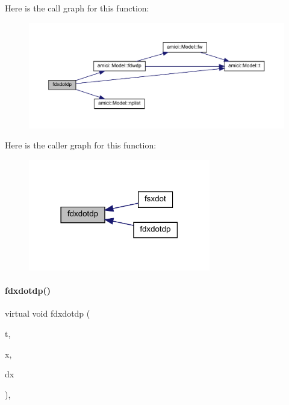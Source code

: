 Here is the call graph for this function\+:
\nopagebreak
\begin{figure}[H]
\begin{center}
\leavevmode
\includegraphics[width=350pt]{classamici_1_1_model___d_a_e_a551dfccd2fb1aa618c644a580639f5b8_cgraph}
\end{center}
\end{figure}
Here is the caller graph for this function\+:
\nopagebreak
\begin{figure}[H]
\begin{center}
\leavevmode
\includegraphics[width=225pt]{classamici_1_1_model___d_a_e_a551dfccd2fb1aa618c644a580639f5b8_icgraph}
\end{center}
\end{figure}
\mbox{\label{classamici_1_1_model___d_a_e_afd60580b84c72713288796453f6da33a}} 
\paragraph{\texorpdfstring{fdxdotdp()}{fdxdotdp()}\hspace{0.1cm}{\footnotesize\ttfamily [2/3]}}
{\footnotesize\ttfamily virtual void fdxdotdp (\begin{DoxyParamCaption}\item[{\mbox{\hyperlink{namespaceamici_a1bdce28051d6a53868f7ccbf5f2c14a3}{realtype}}}]{t,  }\item[{\mbox{\hyperlink{classamici_1_1_ami_vector}{Ami\+Vector}} $\ast$}]{x,  }\item[{\mbox{\hyperlink{classamici_1_1_ami_vector}{Ami\+Vector}} $\ast$}]{dx }\end{DoxyParamCaption})\hspace{0.3cm}{\ttfamily [override]}, {\ttfamily [virtual]}}

